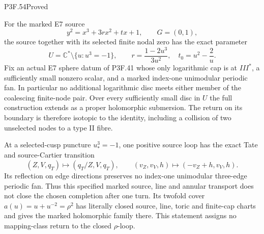 \begin{statement}{P3F.54}{Proved}

For the marked E7 source
\[
 y^2=x^3+3r x^2+t x+1,\qquad G=(0,1),
\]
the source together with its selected finite nodal zero has the exact
parameter
\[
 U=\mathbb C^*\setminus\{u:u^3=-1\},\qquad
 r=\frac{1-2u^3}{3u^2},\quad t_0=u^2-\frac2u .
\]
Fix an actual E7 sphere datum of P3F.41 whose only logarithmic cap
is at \(III^*\), a sufficiently small nonzero scalar, and a marked
index-one unimodular periodic fan. In particular no additional
logarithmic disc meets either member of the coalescing finite-node pair.
Over every sufficiently small disc in \(U\) the full construction
extends as a proper holomorphic submersion. The return on its boundary
is therefore isotopic to the identity, including a collision of two
unselected nodes to a type II fibre.

At a selected-cusp puncture \(u_*^3=-1\), one positive source loop has
the exact Tate and source-Cartier transition
\[
 (Z,V,q_T)\longmapsto(q_T/Z,V,q_T),\qquad
 (v_Z,v_V,h)\longmapsto(-v_Z+h,v_V,h).
\]
Its reflection on edge directions preserves no index-one unimodular
three-edge periodic fan. Thus this specified marked source, line and
annular transport does not close the chosen completion after one turn.
Its twofold cover \(a(u)=u+u^{-2}=\rho^2\) has literally closed source,
line, toric and finite-cap charts and gives the marked holomorphic
family there. This statement assigns no mapping-class return to the
closed \(\rho\)-loop.

\end{statement}
